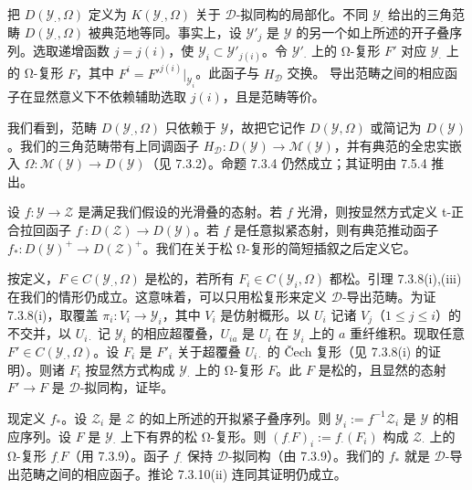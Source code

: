 把 $D(\mathcal{Y}_{\cdot},\Omega)$ 定义为 $K(\mathcal{Y}_{\cdot},\Omega)$ 关于 $\mathcal{D}$-拟同构的局部化。不同 $\mathcal{Y}_{\cdot}$ 给出的三角范畴 $D(\mathcal{Y}_{\cdot},\Omega)$ 被典范地等同。事实上，设 $\mathcal{Y}'_{j}$ 是 $\mathcal{Y}$ 的另一个如上所述的开子叠序列。选取递增函数 $j=j(i)$，使 $\mathcal{Y}_{i}\subset\mathcal{Y}'_{j(i)}$。令 $\mathcal{Y}'_{\cdot}$ 上的 Ω-复形 $F'$ 对应 $\mathcal{Y}_{\cdot}$ 上的 Ω-复形 $F$，其中 $F^{i}=F'^{j(i)}|_{\mathcal{Y}_{i}}$。此函子与 $H_{\mathcal{D}}$ 交换。%
导出范畴之间的相应函子在显然意义下不依赖辅助选取 $j(i)$，且是范畴等价。

我们看到，范畴 $D(\mathcal{Y}_{\cdot},\Omega)$ 只依赖于 $\mathcal{Y}$，故把它记作 $D(\mathcal{Y},\Omega)$ 或简记为 $D(\mathcal{Y})$。我们的三角范畴带有上同调函子 $H_{\mathcal{D}}:D(\mathcal{Y})\to\mathcal{M}(\mathcal{Y})$，并有典范的全忠实嵌入 $\Omega:\mathcal{M}(\mathcal{Y})\to D(\mathcal{Y})$（见 7.3.2）。命题 7.3.4 仍然成立；其证明由 7.5.4 推出。

设 $f:\mathcal{Y}\to\mathcal{Z}$ 是满足我们假设的光滑叠的态射。若 $f$ 光滑，则按显然方式定义 t-正合拉回函子 $f^{\cdot}:D(\mathcal{Z})\to D(\mathcal{Y})$。若 $f$ 是任意拟紧态射，则有典范推动函子 $f_{*}:D(\mathcal{Y})^{+}\to D(\mathcal{Z})^{+}$。我们在关于松 Ω-复形的简短插叙之后定义它。

按定义，$F\in C(\mathcal{Y}_{\cdot},\Omega)$ 是松的，若所有 $F_{i}\in C(\mathcal{Y}_{i},\Omega)$ 都松。引理 7.3.8(i),(iii) 在我们的情形仍成立。这意味着，可以只用松复形来定义 $\mathcal{D}$-导出范畴。为证 7.3.8(i)，取覆盖 $\pi_{i}:V_{i}\to\mathcal{Y}_{i}$，其中 $V_{i}$ 是仿射概形。以 $U_{i}$ 记诸 $V_{j}$（$1\le j\le i$）的不交并，以 $U_{i\cdot}$ 记 $\mathcal{Y}_{i}$ 的相应超覆叠，$U_{ia}$ 是 $U_{i}$ 在 $\mathcal{Y}_{i}$ 上的 $a$ 重纤维积。现取任意 $F'\in C(\mathcal{Y}_{\cdot},\Omega)$。设 $F_{i}$ 是 $F'_{i}$ 关于超覆叠 $U_{i\cdot}$ 的 Čech 复形（见 7.3.8(i) 的证明）。则诸 $F_{i}$ 按显然方式构成 $\mathcal{Y}_{\cdot}$ 上的 Ω-复形 $F$。此 $F$ 是松的，且显然的态射 $F'\to F$ 是 $\mathcal{D}$-拟同构，证毕。

现定义 $f_{*}$。设 $\mathcal{Z}_{i}$ 是 $\mathcal{Z}$ 的如上所述的开拟紧子叠序列。则 $\mathcal{Y}_{i}:=f^{-1}\mathcal{Z}_{i}$ 是 $\mathcal{Y}$ 的相应序列。设 $F$ 是 $\mathcal{Y}_{\cdot}$ 上下有界的松 Ω-复形。则 $(f_{\cdot}F)_{i}:=f_{\cdot}(F_{i})$ 构成 $\mathcal{Z}_{\cdot}$ 上的 Ω-复形 $f_{\cdot}F$（用 7.3.9）。函子 $f_{\cdot}$ 保持 $\mathcal{D}$-拟同构（由 7.3.9）。我们的 $f_{*}$ 就是 $\mathcal{D}$-导出范畴之间的相应函子。推论 7.3.10(ii) 连同其证明仍成立。

